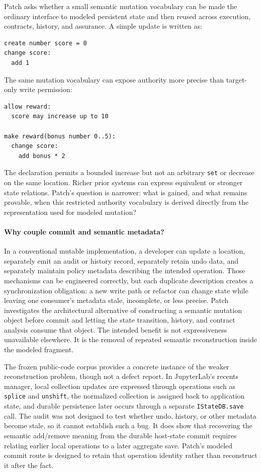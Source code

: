 \documentclass[10pt]{article}
\theoremstyle{plain}
\theoremstyle{remark}
\begin{document}
Patch asks whether a small semantic mutation vocabulary can be made the ordinary interface to modeled persistent state and then reused across execution, contracts, history, and assurance. A simple update is written as:

\begin{lstlisting}
create number score = 0
change score:
  add 1
\end{lstlisting}

The same mutation vocabulary can expose authority more precise than target-only write permission:

\begin{lstlisting}
allow reward:
  score may increase up to 10

make reward(bonus number 0..5):
  change score:
    add bonus * 2
\end{lstlisting}

The declaration permits a bounded increase but not an arbitrary \texttt{set} or decrease on the same location. Richer prior systems can express equivalent or stronger state relations. Patch's question is narrower: what is gained, and what remains provable, when this restricted authority vocabulary is derived directly from the representation used for modeled mutation?

\paragraph{Why couple commit and semantic metadata?}
In a conventional mutable implementation, a developer can update a location, separately emit an audit or history record, separately retain undo data, and separately maintain policy metadata describing the intended operation. Those mechanisms can be engineered correctly, but each duplicate description creates a synchronization obligation: a new write path or refactor can change state while leaving one consumer's metadata stale, incomplete, or less precise. Patch investigates the architectural alternative of constructing a semantic mutation object before commit and letting the state transition, history, and contract analysis consume that object. The intended benefit is not expressiveness unavailable elsewhere. It is the removal of repeated semantic reconstruction inside the modeled fragment.

The frozen public-code corpus provides a concrete instance of the weaker reconstruction problem, though not a defect report. In JupyterLab's recents manager, local collection updates are expressed through operations such as \texttt{splice} and \texttt{unshift}, the normalized collection is assigned back to application state, and durable persistence later occurs through a separate \texttt{IStateDB.save} call. The audit was not designed to test whether undo, history, or other metadata become stale, so it cannot establish such a bug. It does show that recovering the semantic add/remove meaning from the durable host-state commit requires relating earlier local operations to a later aggregate save. Patch's modeled commit route is designed to retain that operation identity rather than reconstruct it after the fact.
\end{document}
